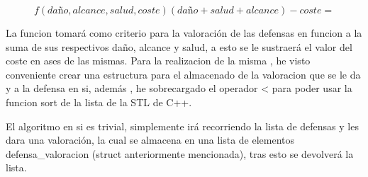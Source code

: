$$ f(daño,alcance,salud,coste)(daño+salud+alcance)-coste=$$

La funcion tomará como criterio para la valoración de las defensas en funcion a la suma 
de sus respectivos daño, alcance y salud, a esto se le sustraerá el valor del coste en 
ases de las mismas.
Para la realizacion de la misma , he visto conveniente crear una estructura para el almacenado 
de la valoracion que se le da y a la defensa en si, además , he sobrecargado el operador < para 
poder usar la funcion sort de la lista de la STL de C++.

El algoritmo en si es trivial, simplemente irá recorriendo la lista de defensas y les dara una 
valoración, la cual se almacena en una lista de elementos defensa_valoracion (struct anteriormente
mencionada), tras esto se devolverá la lista.
